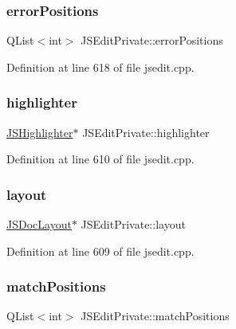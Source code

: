 \subsubsection{\texorpdfstring{error\+Positions}{errorPositions}}
{\footnotesize\ttfamily Q\+List$<$int$>$ J\+S\+Edit\+Private\+::error\+Positions}



Definition at line 618 of file jsedit.\+cpp.

\mbox{\label{class_j_s_edit_private_a389e656a38309d2ca107cdd24aad7cad}} 
\subsubsection{\texorpdfstring{highlighter}{highlighter}}
{\footnotesize\ttfamily \hyperlink{class_j_s_highlighter}{J\+S\+Highlighter}$\ast$ J\+S\+Edit\+Private\+::highlighter}



Definition at line 610 of file jsedit.\+cpp.

\mbox{\label{class_j_s_edit_private_a50545172a9cbef52c9e60bbfc3a72aab}} 
\subsubsection{\texorpdfstring{layout}{layout}}
{\footnotesize\ttfamily \hyperlink{class_j_s_doc_layout}{J\+S\+Doc\+Layout}$\ast$ J\+S\+Edit\+Private\+::layout}



Definition at line 609 of file jsedit.\+cpp.

\mbox{\label{class_j_s_edit_private_aee03b335d00e461cb9d5680929905460}} 
\subsubsection{\texorpdfstring{match\+Positions}{matchPositions}}
{\footnotesize\ttfamily Q\+List$<$int$>$ J\+S\+Edit\+Private\+::match\+Positions}



